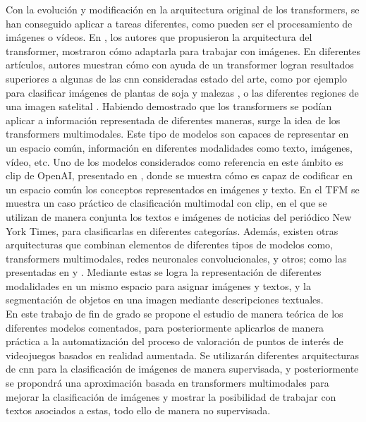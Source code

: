 	Con la evolución y modificación en la arquitectura original de los transformers, se han conseguido aplicar a tareas diferentes, como pueden ser el procesamiento de imágenes o vídeos. En \cite{vit}, los autores que propusieron la arquitectura del transformer, mostraron cómo adaptarla para trabajar con imágenes. En diferentes artículos, autores muestran cómo con ayuda de un transformer logran resultados superiores a algunas de las \gls{cnn} consideradas estado del arte, como por ejemplo para clasificar imágenes de plantas de soja y malezas \cite{ea_vit}, o las diferentes regiones de una imagen satelital \cite{ea_vit2}. Habiendo demostrado que los transformers se podían aplicar a información representada de diferentes maneras, surge la idea de los transformers multimodales. Este tipo de modelos son capaces de representar en un espacio común, información en diferentes modalidades como texto, imágenes, vídeo, etc. Uno de los modelos considerados como referencia en este ámbito es \gls{clip} de OpenAI, presentado en \cite{clip}, donde se muestra cómo es capaz de codificar en un espacio común los conceptos representados en imágenes y texto. En el TFM \cite{ea_multimodal} se muestra un caso práctico de clasificación multimodal con \gls{clip}, en el que se utilizan de manera conjunta los textos e imágenes de noticias del periódico New York Times, para clasificarlas en diferentes categorías. Además, existen otras arquitecturas que combinan elementos de diferentes tipos de modelos como, transformers multimodales, redes neuronales convolucionales, y otros; como las presentadas en \cite{arquitectura_multimodal} y \cite{atencion_multimodal}. Mediante estas se logra la representación de diferentes modalidades en un mismo espacio para asignar imágenes y textos, y la segmentación de objetos en una imagen mediante descripciones textuales. \\
	
	En este trabajo de fin de grado se propone el estudio de manera teórica de los diferentes modelos comentados, para posteriormente aplicarlos de manera práctica a la automatización del proceso de valoración de puntos de interés de videojuegos basados en realidad aumentada. Se utilizarán diferentes arquitecturas de \gls{cnn} para la clasificación de imágenes de manera supervisada, y posteriormente se propondrá una aproximación basada en transformers multimodales para mejorar la clasificación de imágenes y mostrar la posibilidad de trabajar con textos asociados a estas, todo ello de manera no supervisada. 